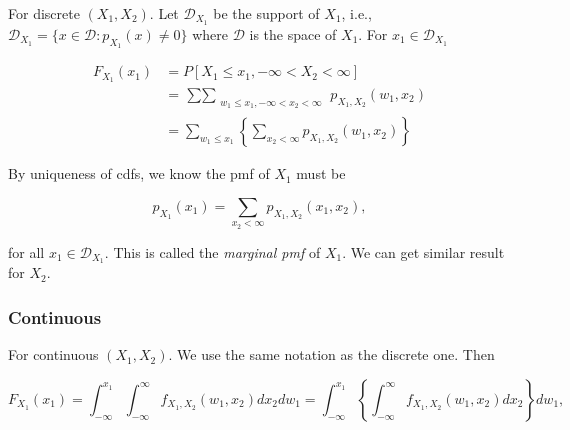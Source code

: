 \documentclass{article}
\begin{document}
                For discrete $ (X_{1}, X_{2}) $. Let $ \mathcal{D}_{X_{1}} $ be the support of $ X_{1} $, i.e.,
                $ \mathcal{D}_{X_{1}} = \{ x \in \mathcal{D} : p_{X_{1}}(x) \neq 0 \} $ where $ \mathcal{D} $ is
                the space of $ X_{1} $. For $ x_{1} \in \mathcal{D}_{X_{1}} $

                \begin{align*}
                    F_{X_{1}}(x_{1}) &= P [ X_{1} \leq x_{1}, -\infty < X_{2} < \infty ] \\
                                     &= \mathop{\sum \sum}_{\substack{w_{1} \leq x_{1}, -\infty < x_{2} < \infty }}
                                        p_{X_{1}, X_{2}}(w_{1}, x_{2}) \\
                                     &= \sum_{ w_{1} \leq x_{1}} \left\{ \sum_{ x_{2} < \infty}
                                            p_{X_{1}, X_{2}}(w_{1}, x_{2})
                                        \right\}
                \end{align*}

                By uniqueness of cdfs, we know the pmf of $ X_{1} $ must be

                \begin{equation*}
                     p_{X_{1}}(x_{1}) = \sum_{x_{2} < \infty} p_{X_{1}, X_{2}} (x_{1}, x_{2}),
                \end{equation*}

                for all $ x_{1} \in \mathcal{D}_{X_{1}} $. This is called the \textit{marginal pmf} of $ X_{1} $.
                We can get similar result for $ X_{2} $.

            \subsubsection{Continuous}

                For continuous $ (X_{1}, X_{2}) $. We use the same notation as the discrete one. Then

                \begin{equation*}
                    F_{X_{1}} (x_{1}) = \int_{ -\infty }^{ x_{1} } \int_{
                        -\infty }^{ \infty } f_{X_{1}, X_{2}} (w_{1}, x_{2}) d x_{2} d w_{1}
                        = \int_{ -\infty }^{ x_{1} } \left\{
                            \int_{ -\infty }^{ \infty } f_{X_{1}, X_{2}} (w_{1}, x_{2}) d x_{2}
                            \right\} d w_{1},
                \end{equation*}
\end{document}
